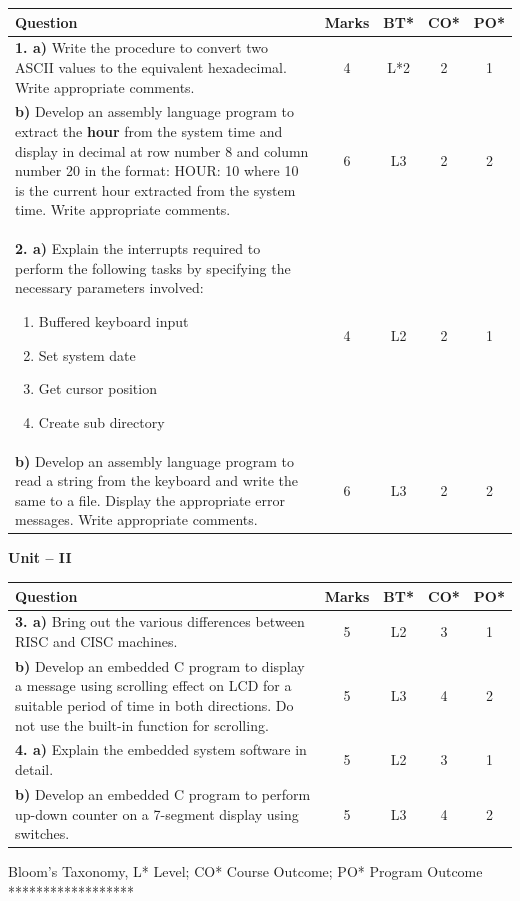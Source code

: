 \documentclass[12pt,a4paper]{article}
\begin{document}
\noindent
\begin{tabular}{|p{10.5cm}|c|c|c|c|}
\hline
\textbf{Question} & \textbf{Marks} & \textbf{BT*} & \textbf{CO*} & \textbf{PO*} \\
\hline
\textbf{1. a)} Write the procedure to convert two ASCII values to the equivalent hexadecimal. Write appropriate comments. & 4 & L*2 & 2 & 1 \\
\hline
\textbf{b)} Develop an assembly language program to extract the \textbf{hour} from the system time and display in decimal at row number 8 and column number 20 in the format: HOUR: 10 where 10 is the current hour extracted from the system time. Write appropriate comments. & 6 & L3 & 2 & 2 \\
\hline
\textbf{2. a)} Explain the interrupts required to perform the following tasks by specifying the necessary parameters involved:
\begin{enumerate}[label=\roman*., nosep]
\item Buffered keyboard input
\item Set system date
\item Get cursor position
\item Create sub directory
\end{enumerate} & 4 & L2 & 2 & 1 \\
\hline
\textbf{b)} Develop an assembly language program to read a string from the keyboard and write the same to a file. Display the appropriate error messages. Write appropriate comments. & 6 & L3 & 2 & 2 \\
\hline
\end{tabular}

\vspace{0.5cm}

\begin{center}
{\large \textbf{Unit -- II}}
\end{center}

\noindent
\begin{tabular}{|p{10.5cm}|c|c|c|c|}
\hline
\textbf{Question} & \textbf{Marks} & \textbf{BT*} & \textbf{CO*} & \textbf{PO*} \\
\hline
\textbf{3. a)} Bring out the various differences between RISC and CISC machines. & 5 & L2 & 3 & 1 \\
\hline
\textbf{b)} Develop an embedded C program to display a message using scrolling effect on LCD for a suitable period of time in both directions. Do not use the built-in function for scrolling. & 5 & L3 & 4 & 2 \\
\hline
\textbf{4. a)} Explain the embedded system software in detail. & 5 & L2 & 3 & 1 \\
\hline
\textbf{b)} Develop an embedded C program to perform up-down counter on a 7-segment display using switches. & 5 & L3 & 4 & 2 \\
\hline
\end{tabular}

\vspace{0.5cm}
\begin{center}
\small{Bloom's Taxonomy, L* Level; CO* Course Outcome; PO* Program Outcome}\\[0.3cm]
******************
\end{center}
\end{document}
